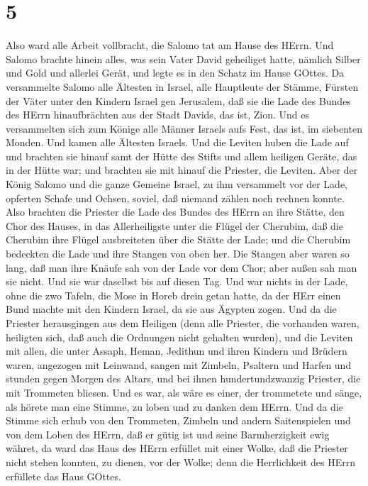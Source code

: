 \hypertarget{section-4}{%
\section{5}\label{section-4}}

 Also ward alle Arbeit vollbracht, die Salomo tat am Hause
des HErrn. Und Salomo brachte hinein alles, was sein Vater David
geheiliget hatte, nämlich Silber und Gold und allerlei Gerät, und legte
es in den Schatz im Hause GOttes.  Da versammelte Salomo
alle Ältesten in Israel, alle Hauptleute der Stämme, Fürsten der Väter
unter den Kindern Israel gen Jerusalem, daß sie die Lade des Bundes des
HErrn hinaufbrächten aus der Stadt Davids, das ist, Zion. 
Und es versammelten sich zum Könige alle Männer Israels aufs Fest, das
ist, im siebenten Monden.  Und kamen alle Ältesten Israels.
Und die Leviten huben die Lade auf  und brachten sie hinauf
samt der Hütte des Stifts und allem heiligen Geräte, das in der Hütte
war; und brachten sie mit hinauf die Priester, die Leviten. 
Aber der König Salomo und die ganze Gemeine Israel, zu ihm versammelt
vor der Lade, opferten Schafe und Ochsen, soviel, daß niemand zählen
noch rechnen konnte.  Also brachten die Priester die Lade
des Bundes des HErrn an ihre Stätte, den Chor des Hauses, in das
Allerheiligste unter die Flügel der Cherubim,  daß die
Cherubim ihre Flügel ausbreiteten über die Stätte der Lade; und die
Cherubim bedeckten die Lade und ihre Stangen von oben her. 
Die Stangen aber waren so lang, daß man ihre Knäufe sah von der Lade vor
dem Chor; aber außen sah man sie nicht. Und sie war daselbst bis auf
diesen Tag.  Und war nichts in der Lade, ohne die zwo
Tafeln, die Mose in Horeb drein getan hatte, da der HErr einen Bund
machte mit den Kindern Israel, da sie aus Ägypten zogen. 
Und da die Priester herausgingen aus dem Heiligen (denn alle Priester,
die vorhanden waren, heiligten sich, daß auch die Ordnungen nicht
gehalten wurden),  und die Leviten mit allen, die unter
Assaph, Heman, Jedithun und ihren Kindern und Brüdern waren, angezogen
mit Leinwand, sangen mit Zimbeln, Psaltern und Harfen und stunden gegen
Morgen des Altars, und bei ihnen hundertundzwanzig Priester, die mit
Trommeten bliesen.  Und es war, als wäre es einer, der
trommetete und sänge, als hörete man eine Stimme, zu loben und zu danken
dem HErrn. Und da die Stimme sich erhub von den Trommeten, Zimbeln und
andern Saitenspielen und von dem Loben des HErrn, daß er gütig ist und
seine Barmherzigkeit ewig währet, da ward das Haus des HErrn erfüllet
mit einer Wolke,  daß die Priester nicht stehen konnten, zu
dienen, vor der Wolke; denn die Herrlichkeit des HErrn erfüllete das
Haus GOttes.

